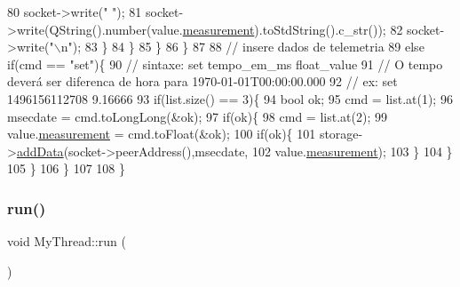 \begin{DoxyCode}
80           socket->write(\textcolor{stringliteral}{" "});
81           socket->write(QString().number(value.\mbox{\hyperlink{struct_entry_a78ebc6241b1baaa2551b2cf89f519960}{measurement}}).toStdString().c\_str());
82           socket->write(\textcolor{stringliteral}{"\(\backslash\)n"});
83         \}
84       \}
85     \}
86   \}
87 
88   \textcolor{comment}{// insere dados de telemetria}
89   \textcolor{keywordflow}{else} \textcolor{keywordflow}{if}(cmd == \textcolor{stringliteral}{"set"})\{
90     \textcolor{comment}{// sintaxe: set tempo\_em\_ms float\_value}
91     \textcolor{comment}{// O tempo deverá ser diferenca de hora para 1970-01-01T00:00:00.000}
92     \textcolor{comment}{// ex: set 1496156112708 9.16666}
93     \textcolor{keywordflow}{if}(list.size() == 3)\{
94       \textcolor{keywordtype}{bool} ok;
95       cmd = list.at(1);
96       msecdate = cmd.toLongLong(&ok);
97       \textcolor{keywordflow}{if}(ok)\{
98         cmd = list.at(2);
99         value.\mbox{\hyperlink{struct_entry_a78ebc6241b1baaa2551b2cf89f519960}{measurement}} = cmd.toFloat(&ok);
100         \textcolor{keywordflow}{if}(ok)\{
101           storage->\mbox{\hyperlink{class_data_storage_ab46b18762db5b17b3e0a97150079cb78}{addData}}(socket->peerAddress(),msecdate,
102                            value.\mbox{\hyperlink{struct_entry_a78ebc6241b1baaa2551b2cf89f519960}{measurement}});
103         \}
104       \}
105     \}
106   \}
107 
108 \}
\end{DoxyCode}
\mbox{\label{class_my_thread_a48f2e366e852087c53705f64e1ee65c2}} 
\subsubsection{\texorpdfstring{run()}{run()}}
{\footnotesize\ttfamily void My\+Thread\+::run (\begin{DoxyParamCaption}{ }\end{DoxyParamCaption})}


